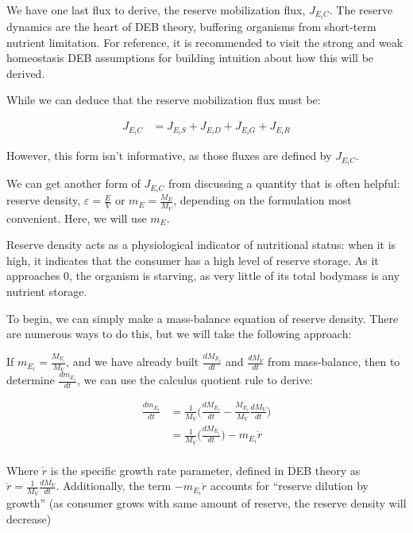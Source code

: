 \documentclass[
]{article}
\begin{document}
We have one last flux to derive, the reserve mobilization flux,
\(J_{E_{i}C}\). The reserve dynamics are the heart of DEB theory,
buffering organisms from short-term nutrient limitation. For reference,
it is recommended to visit the strong and weak homeostasis DEB
assumptions for building intuition about how this will be derived.

While we can deduce that the reserve mobilization flux must be:

\begin{align*}
J_{{E_i}C} &= J_{{E_i}S} + J_{{E_i}D} + J_{{E_i}G} + J_{{E_i}R}
\end{align*}

However, this form isn't informative, as those fluxes are defined by
\(J_{{E_i}C}\).

We can get another form of \(J_{{E_i}C}\) from discussing a quantity
that is often helpful: reserve density, \(\varepsilon=\frac{E}{V}\) or
\(m_E = \frac{M_E}{M_V}\), depending on the formulation most convenient.
Here, we will use \(m_E\).

Reserve density acts as a physiological indicator of nutritional status:
when it is high, it indicates that the consumer has a high level of
reserve storage. As it approaches 0, the organism is starving, as very
little of its total bodymass is any nutrient storage.

To begin, we can simply make a mass-balance equation of reserve density.
There are numerous ways to do this, but we will take the following
approach:

If \(m_{E_i} = \frac{M_{E_i}}{M_V}\), and we have already built
\(\frac{d{M_{E_i}}}{dt}\) and \(\frac{d{M_V}}{dt}\) from mass-balance,
then to determine \(\frac{d{m_{E_i}}}{dt}\), we can use the calculus
quotient rule to derive:

\begin{align*}
\frac{d{m_{E_i}}}{dt} &= \frac{1}{M_V}\biggr(\frac{d{M_{E_i}}}{dt} - \frac{M_{E_i}}{M_V}\frac{dM_V}{dt}\biggr)
\\
&= \frac{1}{M_V}\biggl(\frac{dM_{E_i}}{dt}\biggr) - m_{E_i}\dot{r}
\\
\end{align*}

Where \(\dot{r}\) is the specific growth rate parameter, defined in DEB
theory as \(\dot{r}=\frac{1}{M_V}\frac{dM_V}{dt}\). Additionally, the
term \(-m_{E_i}\dot{r}\) accounts for ``reserve dilution by growth'' (as
consumer grows with same amount of reserve, the reserve density will
decrease)
\end{document}
